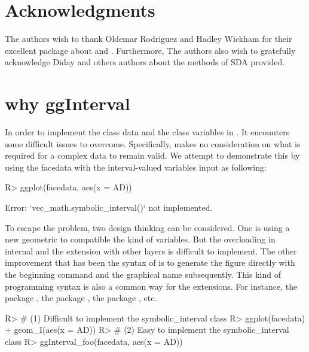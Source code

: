\documentclass[article]{jss}
\begin{document}
\section*{Acknowledgments}

The authors wish to thank Oldemar Rodriguez and Hadley Wickham for their excellent package about  and  . Furthermore, The authors also wish to gratefully acknowledge Diday and others authors about the methods of SDA provided.

\section*{why ggInterval}
In order to implement the  class data and the  class variables in . It encounters some difficult issues to overcome. Specifically,  makes no consideration on what is required for a complex data to remain valid. We attempt to demonstrate this by using the facedata with the interval-valued variables input as following:
\begin{CodeChunk}
\begin{CodeInput}
R> ggplot(facedata, aes(x = AD))
\end{CodeInput}
\begin{CodeOutput}
Error: `vec_math.symbolic_interval()` not implemented.
\end{CodeOutput}
\end{CodeChunk}

To escape the problem, two design thinking can be considered. One is using a new geometric to compatible the kind of variables. But the overloading in  internal and the extension with other layers is difficult to implement. The other improvement that has been the syntax of  is to generate the figure directly with the beginning command  and the graphical name subsequently. This kind of programming syntax is also a common way for the  extensions. For instance, the  package \cite{ggtern}, the  package \cite{maag2018gganatogram},
the  package \cite{patil2018ggstatsplot}, etc.

\begin{CodeChunk}
\begin{CodeInput}
R> # (1) Difficult to implement the symbolic_interval class
R> ggplot(facedata) + geom_I(aes(x = AD))
R> # (2) Easy to implement the symbolic_interval class
R> ggInterval_foo(facedata, aes(x = AD))
\end{CodeInput}
\end{CodeChunk}
\end{document}

